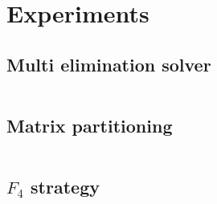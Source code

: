 \chapter{Experiments}

\section{Multi elimination solver}
\begin{figure}[ht]
  \centering
  \resizebox{0.9\textwidth}{!}{}
\end{figure}

\begin{table}[ht]
  \centering
  \begin{tabular}{|c||ccc|}
    \hline
    
    \hline
  \end{tabular}
\end{table}

\section{Matrix partitioning}
\begin{figure}[ht]
  \centering
  \resizebox{0.9\textwidth}{!}{}
\end{figure}

\begin{table}[ht]
  \centering
  \begin{tabular}{|c||ccc|}
    \hline
    
    \hline
  \end{tabular}
\end{table}

\section{$F_4$ strategy}
\begin{figure}[ht]
  \centering
  \resizebox{0.9\textwidth}{!}{}
\end{figure}

\begin{table}[ht]
  \centering
  \begin{tabular}{|c||cc|}
    \hline
    
    \hline
  \end{tabular}
\end{table}
